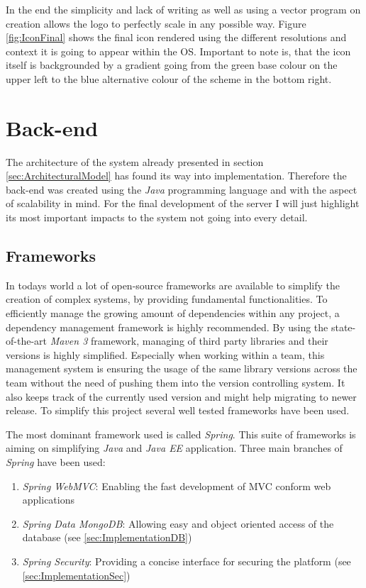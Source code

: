 In the end the simplicity and lack of writing as well as using a vector program on creation allows the logo to perfectly scale in any possible way. Figure \vref{fig:IconFinal} shows the final icon rendered using the different resolutions and context it is going to appear within the \gls{OS}. Important to note is, that the icon itself is backgrounded by a gradient going from the green base colour on the upper left to the blue alternative colour of the scheme in the bottom right.

\section{Back-end}
The architecture of the system already presented in section \vref{sec:ArchitecturalModel} has found its way into implementation. Therefore the back-end was created using the \emph{Java} programming language and with the aspect of scalability in mind. For the final development of the server I will just highlight its most important impacts to the system not going into every detail.

\subsection{Frameworks}
\label{sec:FrameworksServer}

In todays world a lot of open-source frameworks are available to simplify the creation of complex systems, by providing fundamental functionalities. To efficiently manage the growing amount of dependencies within any project, a dependency management framework is highly recommended. By using the state-of-the-art \emph{Maven 3} framework, managing of third party libraries and their versions is highly simplified. Especially when working within a team, this management system is ensuring the usage of the same library versions across the team without the need of pushing them into the version controlling system. It also keeps track of the currently used version and might help migrating to newer release. To simplify this project several well tested frameworks have been used.

The most dominant framework used is called \emph{Spring}. This suite of frameworks is aiming on simplifying \emph{Java} and \emph{Java EE} application. Three main branches of \emph{Spring} have been used:

\begin{enumerate}
    \item \emph{Spring WebMVC}: Enabling the fast development of \gls{MVC} conform web applications
    \item \emph{Spring Data MongoDB}: Allowing easy and object oriented access of the database (see \vref{sec:ImplementationDB})
    \item \emph{Spring Security}: Providing a concise interface for securing the platform (see \vref{sec:ImplementationSec})
\end{enumerate}

